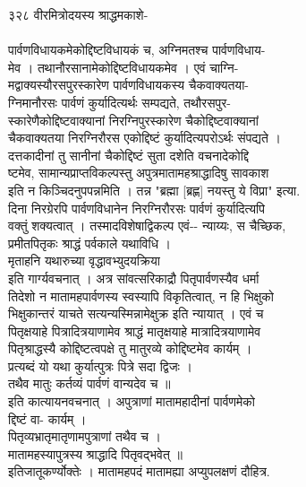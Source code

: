 \documentclass[11pt, openany]{book}
\begin{document}
{{{{{{{{{{{{{{{{{{{{{{{{{{{{{{{{{{{{{{{{{{{{{{{{{{{{{{{{{{{{{{{{{{{{{{{{{{{{{{{{{{{{{{{{{{{{{{{{{{{{{{{{{{{{{{{३२८ वीरमित्रोदयस्य श्राद्धमकाशे-\\
~\\
पार्वणविधायकमेकोद्दिष्टविधायकं च, अग्निमतश्च पार्वणविधाय-\\
मेव । तथानौरसानामेकोद्दिष्टविधायकमेव । एवं चाग्नि-\\
मद्वाक्यस्यौरसपुरस्कारेण पार्वणविधायकस्य चैकवाक्यतया-\\
ग्निमानौरसः }{पार्वणं}{ कुर्यादित्यर्थः सम्पद्यते, तथौरसपुर-\\
स्कारेणैकोद्दिष्टवाक्यानां निरग्निपुरस्कारेण चैकोद्दिष्टवाक्यानां\\
चैकवाक्यतया निरग्निरौरस एकोद्दिष्टं कुर्यादित्यपरोऽर्थः संपद्यते ।\\
दत्तकादीनां तु सानीनां चैकोद्दिष्टं सुता दशेति वचनादेकोद्दि\\
ष्टमेव, सामान्यप्राप्तविकल्पस्तु अपुत्रमातामहश्राद्धादिषु सावकाश\\
इति न किञ्चिदनुपपन्नमिति । तन्न \textbar{} "ब्रह्मा {[}ब्रह्ण{]} नयस्तु
ये विप्रा" इत्या.\\
दिना निरग्रेरपि पार्वणविधानेन निरग्निरौरसः }{पार्वणं}{ कुर्यादित्यपि\\
वक्तुं शक्यत्वात् । तस्मादविशेषाद्विकल्प एवं-\/- न्याय्यः, स चैच्छिक,\\
प्रमीतपितृकः }{श्राद्धं}{ पर्वकाले यथाविधि ।\\
मृताहनि यथारुच्या वृद्धावभ्युदयक्रिया \textbar{}\textbar{}\\
इति गार्ग्यवचनात् । अत्र सांवत्सरिकाद्रौ पितृपार्वणस्यैव धर्मा\\
तिदेशो न मातामहपार्वणस्य स्वस्यापि विकृतित्वात्, न हि भिक्षुको\\
भिक्षुकान्तरं याचते सत्यन्यस्मिन्नामेक्षुक्र इति न्यायात् । एवं च\\
पितृक्षयाहे पित्रादित्रयाणामेव श्राद्धं मातृक्षयाहे
मात्रादित्रयाणामेव\\
पितृश्राद्धस्यै कोद्दिष्टत्वपक्षे तु मातुरव्ये कोद्दिष्टमेव कार्यम् ।\\
प्रत्यब्दं यो यथा कुर्यात्पुत्रः पित्रे सदा द्विजः ।\\
तथैव मातुः कर्तव्यं }{पार्वणं}{ वान्यदेव च ॥\\
इति कात्यायनवचनात् । अपुत्राणां मातामहादीनां पार्वणमेको\\
द्दिष्टं }{वा-}{ कार्यम् ।\\
पितृव्यभ्रातृमातृणामपुत्राणां तथैव च ।\\
मातामहस्यापुत्रस्य श्राद्धादि पितृवद्भवेत् ॥\\
इतिजातूकर्ण्योक्तेः । मातामहपदं मातामह्या अप्युपलक्षणं दौहित्र.\\
}}}}}}}}}}}}}}}}}}}}}}}}}}}}}}}}}}}}}}}}}}}}}}}}}}}}}}}}}}}}}}}}}}}}}}}}}}}}}}}}}}}}}}}}}}}}}}}}}}}}}}}}}}}}}}}
\end{document}
